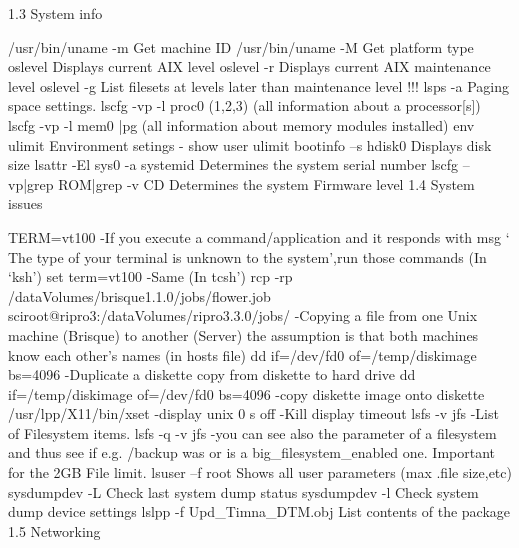     
1.3    System info

/usr/bin/uname -m    Get machine ID
/usr/bin/uname -M    Get platform type
oslevel    Displays current AIX level
oslevel -r    Displays current AIX maintenance level
oslevel -g    List filesets at levels later than maintenance level !!!
lsps -a    Paging space settings.
lscfg -vp -l proc0  (1,2,3)   (all information about a processor[s])
lscfg -vp -l mem0 |pg    (all information about memory modules installed)
env ulimit    Environment setings - show user ulimit
bootinfo –s hdisk0     Displays disk size
lsattr -El sys0 -a systemid   Determines the system serial number
lscfg –vp|grep ROM|grep -v CD  Determines the system Firmware level
1.4    System issues

TERM=vt100      -If you execute a command/application and it responds with msg
‘ The type of your terminal is unknown to the system’,run those commands (In ‘ksh’)
set term=vt100   -Same (In tcsh’)
rcp -rp /dataVolumes/brisque1.1.0/jobs/flower.job sciroot@ripro3:/dataVolumes/ripro3.3.0/jobs/ -Copying a file from one Unix machine (Brisque) to another (Server) the assumption is that both machines know each other’s names (in hosts file)
dd if=/dev/fd0 of=/temp/diskimage bs=4096 -Duplicate a diskette copy from diskette to hard drive
dd if=/temp/diskimage of=/dev/fd0 bs=4096  -copy diskette image onto diskette
/usr/lpp/X11/bin/xset -display unix 0 s off  -Kill display timeout
lsfs -v jfs  -List of Filesystem items.
lsfs -q -v jfs         -you can see also the parameter of a filesystem and thus see if e.g. /backup was or is a big_filesystem_enabled one.
Important for the 2GB File limit.
lsuser –f root    Shows all user parameters (max .file size,etc)
sysdumpdev -L    Check last system dump status
sysdumpdev -l    Check system dump device settings
lslpp -f Upd_Timna_DTM.obj    List contents of the package
1.5    Networking

